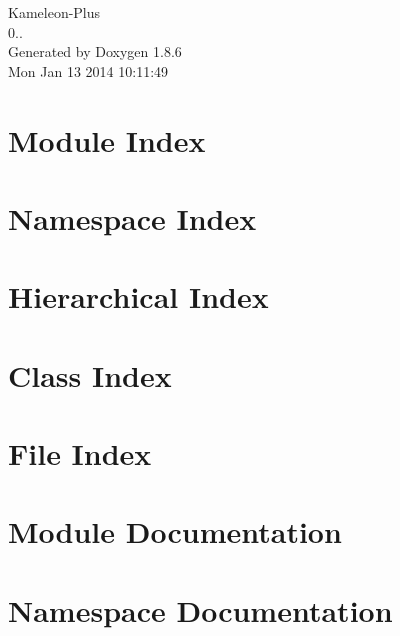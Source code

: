 \documentclass[twoside]{book}
\newcommand{\clearemptydoublepage}{%
  \newpage{\pagestyle{empty}\cleardoublepage}%
}
\begin{document}
\hypersetup{pageanchor=false}
\begin{titlepage}
\vspace*{7cm}
\begin{center}%
{\Large Kameleon-\/\-Plus \\[1ex]\large 0.. }\\
\vspace*{1cm}
{\large Generated by Doxygen 1.8.6}\\
\vspace*{0.5cm}
{\small Mon Jan 13 2014 10:11:49}\\
\end{center}
\end{titlepage}
\clearemptydoublepage
\tableofcontents
\clearemptydoublepage
{}
\hypersetup{pageanchor=true}

\chapter{Module Index}

\chapter{Namespace Index}

\chapter{Hierarchical Index}

\chapter{Class Index}

\chapter{File Index}

\chapter{Module Documentation}







\chapter{Namespace Documentation}










\end{document}
